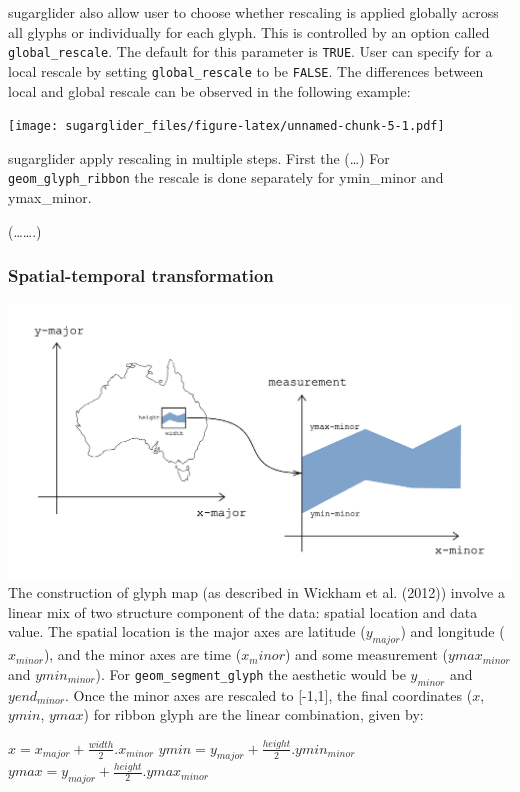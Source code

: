 sugarglider also allow user to choose whether rescaling is applied globally across all glyphs or individually for each glyph. This is controlled by an option called \texttt{global\_rescale}. The default for this parameter is \texttt{TRUE}. User can specify for a local rescale by setting \texttt{global\_rescale} to be \texttt{FALSE}. The differences between local and global rescale can be observed in the following example:

\texttt{[image: sugarglider\_files/figure-latex/unnamed-chunk-5-1.pdf]}

sugarglider apply rescaling in multiple steps. First the (\ldots)
For \texttt{geom\_glyph\_ribbon} the rescale is done separately for ymin\_minor and ymax\_minor.

(\ldots\ldots.)

\hypertarget{spatial-temporal-transformation}{%
\subsubsection{Spatial-temporal transformation}\label{spatial-temporal-transformation}}

\includegraphics{figures/diagram-transformation.png}
The construction of glyph map (as described in Wickham et al. (2012)) involve a linear mix of two structure component of the data: spatial location and data value. The spatial location is the major axes are latitude (\(y_{major}\)) and longitude (\(x_{minor}\)), and the minor axes are time (\(x_minor\)) and some measurement (\(ymax_{minor}\) and \(ymin_{minor}\)). For \texttt{geom\_segment\_glyph} the aesthetic would be \(y_{minor}\) and \(yend_{minor}\). Once the minor axes are rescaled to {[}-1,1{]}, the final coordinates (\(x\),\(ymin\), \(ymax\)) for ribbon glyph are the linear combination, given by:

\(x = x_{major} + \frac{width}{2}.x_{minor}\)
\(ymin = y_{major} + \frac{height}{2}.ymin_{minor}\)
\(ymax = y_{major} + \frac{height}{2}.ymax_{minor}\)

